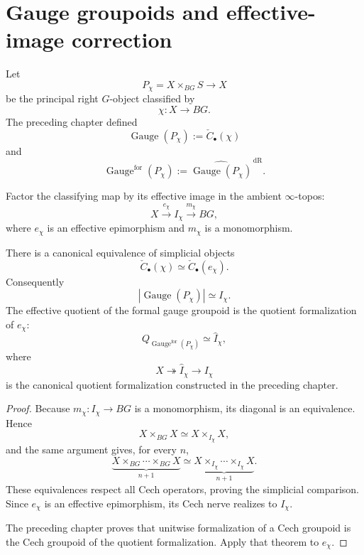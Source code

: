 \section{Gauge groupoids and effective-image correction}
\label{sec:bnla-gauge-specialization}

Let
\[
    P_\chi=X\times_{BG}S\longrightarrow X
\]
be the principal right $G$-object classified by
\[
    \chi:X\longrightarrow BG.
\]
The preceding chapter defined
\[
    \operatorname{Gauge}(P_\chi)
    :=
    \check C_\bullet(\chi)
\]
and
\[
    \operatorname{Gauge}^{\mathrm{for}}(P_\chi)
    :=
    \widehat{\operatorname{Gauge}(P_\chi)}^{\,\mathrm{dR}}.
\]

Factor the classifying map by its effective image in the ambient $\infty$-topos:
\[
    X\xrightarrow{e_\chi}I_\chi
    \xrightarrow{m_\chi}BG,
\]
where $e_\chi$ is an effective epimorphism and $m_\chi$ is a monomorphism.

\begin{theorem}
\label{thm:bnla-gauge-effective-image}
There is a canonical equivalence of simplicial objects
\[
    \boxed{
    \check C_\bullet(\chi)
    \simeq
    \check C_\bullet(e_\chi).}
\]
Consequently
\[
    \left|\operatorname{Gauge}(P_\chi)\right|
    \simeq
    I_\chi.
\]
The effective quotient of the formal gauge groupoid is the quotient
formalization of $e_\chi$:
\[
    \boxed{
    Q_{\operatorname{Gauge}^{\mathrm{for}}(P_\chi)}
    \simeq
    \widehat I_\chi,}
\]
where
\[
    X\twoheadrightarrow\widehat I_\chi
    \longrightarrow I_\chi
\]
is the canonical quotient formalization constructed in the preceding chapter.
\end{theorem}

\begin{proof}
Because $m_\chi:I_\chi\to BG$ is a monomorphism, its diagonal is an
equivalence.  Hence
\[
    X\times_{BG}X
    \simeq
    X\times_{I_\chi}X,
\]
and the same argument gives, for every $n$,
\[
    \underbrace{X\times_{BG}\cdots\times_{BG}X}_{n+1}
    \simeq
    \underbrace{X\times_{I_\chi}\cdots\times_{I_\chi}X}_{n+1}.
\]
These equivalences respect all Cech operators, proving the simplicial
comparison.  Since $e_\chi$ is an effective epimorphism, its Cech nerve
realizes to $I_\chi$.

The preceding chapter proves that unitwise formalization of a Cech groupoid is
the Cech groupoid of the quotient formalization.  Apply that theorem to
$e_\chi$.
\end{proof}

